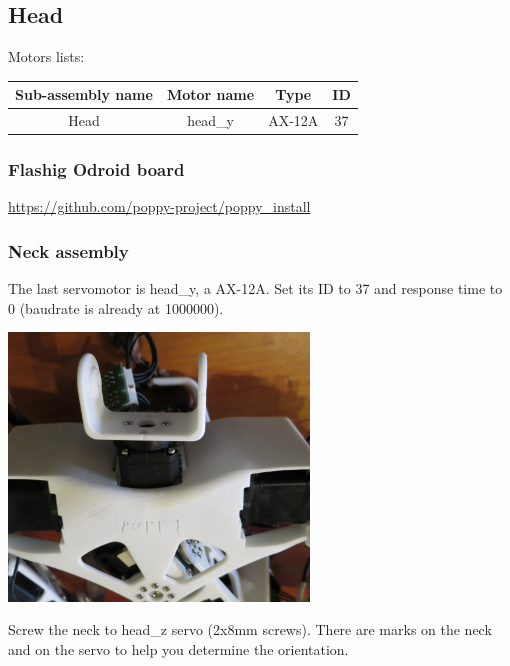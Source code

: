 \documentclass{article}
\begin{document}
\subsection{Head} 

Motors lists:

\begin{center}

\begin{tabular}{|c|c|c|c|}
\hline 
Sub-assembly name & Motor name & Type & ID \\ 
\hline 

Head & head\_y & AX-12A & 37 \\ 
\hline 
\end{tabular} 
\end{center}

\subsubsection{Flashig Odroid board}

\url{https://github.com/poppy-project/poppy_install}

\subsubsection{Neck assembly}

The last servomotor is head\_y, a AX-12A. Set its ID to 37 and response time to 0 (baudrate is already at 1000000).


 \begin{center}
  \includegraphics[width=0.6\textwidth]{neck1}
 \end{center}
 
 Screw the neck to head\_z servo (\diameter 2x8mm screws). There are marks on the neck and on the servo to help you determine the orientation.
 
\end{document}
